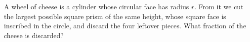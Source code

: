 A wheel of cheese is a cylinder whose circular face has radius $r$. From it we cut the largest possible square prism of the same height, whose square face is inscribed in the circle, and discard the four leftover pieces. What fraction of the cheese is discarded?
